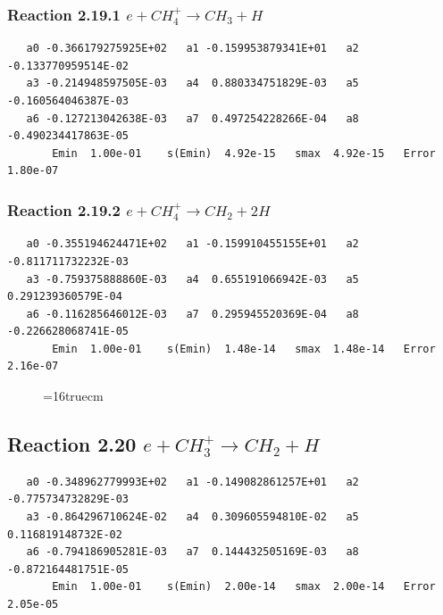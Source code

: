 \documentclass[12pt,dvipdfmx]{article}
\begin{document}
\subsubsection{
Reaction 2.19.1    $e + CH_4^+ \rightarrow CH_3 + H $
}

\begin{small}\begin{verbatim}
   a0 -0.366179275925E+02   a1 -0.159953879341E+01   a2 -0.133770959514E-02
   a3 -0.214948597505E-03   a4  0.880334751829E-03   a5 -0.160564046387E-03
   a6 -0.127213042638E-03   a7  0.497254228266E-04   a8 -0.490234417863E-05
       Emin  1.00e-01    s(Emin)  4.92e-15   smax  4.92e-15   Error  1.80e-07
\end{verbatim}\end{small}

\subsubsection{
Reaction 2.19.2    $e + CH_4^+ \rightarrow CH_2 + 2H $
}

\begin{small}\begin{verbatim}
   a0 -0.355194624471E+02   a1 -0.159910455155E+01   a2 -0.811711732232E-03
   a3 -0.759375888860E-03   a4  0.655191066942E-03   a5  0.291239360579E-04
   a6 -0.116285646012E-03   a7  0.295945520369E-04   a8 -0.226628068741E-05
       Emin  1.00e-01    s(Emin)  1.48e-14   smax  1.48e-14   Error  2.16e-07
\end{verbatim}\end{small}

\begin{figure} \label{met.1_2.19}
\epsfxsize=16truecm
\end{figure}
\newpage

\subsection{
Reaction 2.20     $e + CH_3^+ \rightarrow CH_2 + H $
}

\begin{small}\begin{verbatim}
   a0 -0.348962779993E+02   a1 -0.149082861257E+01   a2 -0.775734732829E-03
   a3 -0.864296710624E-02   a4  0.309605594810E-02   a5  0.116819148732E-02
   a6 -0.794186905281E-03   a7  0.144432505169E-03   a8 -0.872164481751E-05
       Emin  1.00e-01    s(Emin)  2.00e-14   smax  2.00e-14   Error  2.05e-05
\end{verbatim}\end{small}
\end{document}
